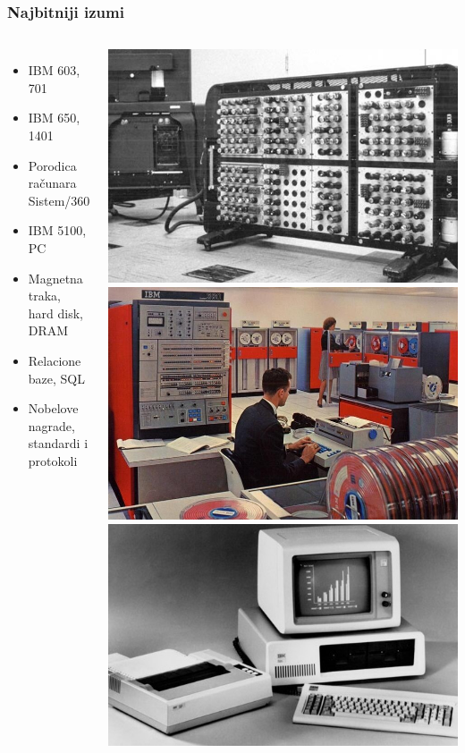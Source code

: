 \documentclass{beamer}
\begin{document}
\begin{frame}[fragile]\frametitle{Najbitniji izumi}
\begin{columns}
	\begin{itemize}	
	\setlength{\itemindent}{3em}
		\item IBM 603, 701
		\item IBM 650, 1401	
		\item Porodica računara Sistem/360
		\item IBM 5100, PC
		\item Magnetna traka, hard disk, DRAM
		\item Relacione baze, SQL
		\item Nobelove nagrade, standardi i protokoli
		\end{itemize}
		\includegraphics[width=0.77\linewidth]{ibm603.jpg}
  \label{fig:1}
  \includegraphics[width=0.77\linewidth]{sys360.jpg}
  \label{fig:2}
  \includegraphics[width=0.77\linewidth]{ibmpc2.jpg}
  \label{fig:3}
\end{columns}
\end{frame}
\end{document}

